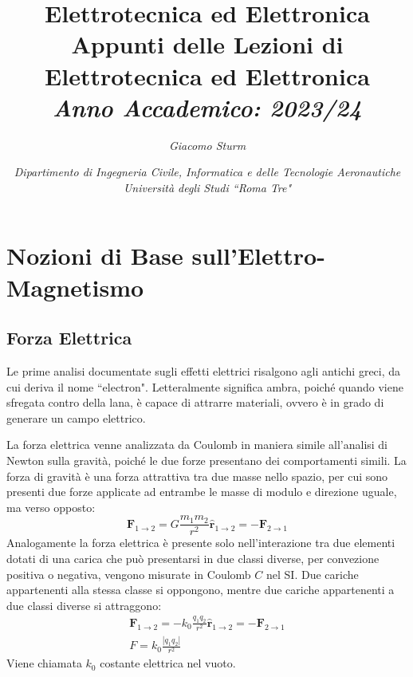 \documentclass{article}
\newcommand{\vect}[1]{\boldsymbol{\mathbf{#1}}}
\numberwithin{equation}{subsection}
\begin{document}
\title{%
    \textbf{Elettrotecnica ed Elettronica}  \\ 
    \large Appunti delle Lezioni di Elettrotecnica ed Elettronica\\
    \textit{Anno Accademico: 2023/24}}
\author{\textit{Giacomo Sturm}}
\date{\textit{Dipartimento di Ingegneria Civile, Informatica e delle Tecnologie Aeronautiche \\
Università degli Studi ``Roma Tre"}}

\maketitle
\thispagestyle{link}


\clearpage

\pagestyle{fancy}
\fancyhead{}\fancyfoot{}
\fancyfoot[C]{\thepage}

\tableofcontents

\clearpage


\section{Nozioni di Base sull'Elettro-Magnetismo}

\subsection{Forza Elettrica}
Le prime analisi documentate sugli effetti elettrici risalgono agli antichi greci, da cui deriva il nome ``electron". %
Letteralmente significa ambra, poiché 
quando viene sfregata contro della lana, è capace di attrarre materiali, ovvero è in grado di generare un campo elettrico.

La forza elettrica venne analizzata da Coulomb in maniera simile all'analisi di Newton sulla gravità, poiché le due forze presentano dei comportamenti simili. La forza di 
gravità è una forza attrattiva tra due masse nello spazio, per cui sono presenti due forze applicate ad entrambe le masse di modulo e direzione uguale, ma verso opposto: 
\begin{equation*}
    \vect{F}_{1\to2}=G\displaystyle\frac{m_1m_2}{r^2}\hat{\vect{r}}_{1\to2}=-\vect{F}_{2\to1}
\end{equation*}
Analogamente la forza elettrica è presente solo nell'interazione tra due elementi dotati di una carica che può presentarsi in due classi diverse, per convezione 
positiva o negativa, vengono misurate in Coulomb $C$ nel SI. Due cariche appartenenti alla stessa classe si oppongono, mentre due cariche appartenenti a due classi diverse 
si attraggono:
\begin{gather}
    \vect{F}_{1\to2}=-k_0\displaystyle\frac{q_1q_2}{r^2}\hat{\vect{r}}_{1\to2}=-\vect{F}_{2\to1}\\
    F=k_0\displaystyle\frac{|q_1q_2|}{r^2}
\end{gather} 
Viene chiamata $k_0$ costante elettrica nel vuoto. 
\end{document}
